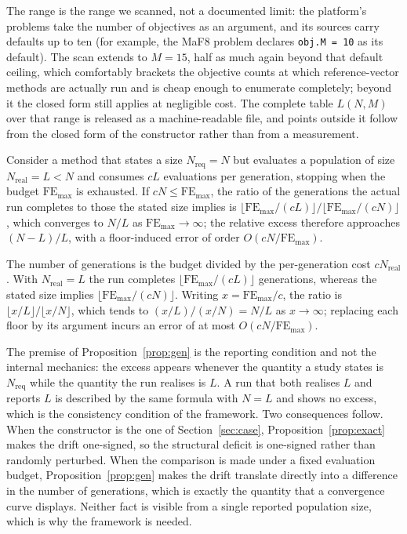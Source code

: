 \documentclass{SCIS2026}
\begin{document}
The range is the range we scanned, not a documented limit: the platform's problems take the number of objectives as an argument, and its sources carry defaults up to ten (for example, the MaF8 problem declares \texttt{obj.M~=~10} as its default). The scan extends to $M=15$, half as much again beyond that default ceiling, which comfortably brackets the objective counts at which reference-vector methods are actually run and is cheap enough to enumerate completely; beyond it the closed form still applies at negligible cost. The complete table $L(N,M)$ over that range is released as a machine-readable file, and points outside it follow from the closed form of the constructor rather than from a measurement.

\begin{proposition}\label{prop:gen}
Consider a method that states a size $N_{\mathrm{req}}=N$ but evaluates a population of size $N_{\mathrm{real}}=L<N$ and consumes $cL$ evaluations per generation, stopping when the budget $\mathrm{FE}_{\max}$ is exhausted. If $cN\le \mathrm{FE}_{\max}$, the ratio of the generations the actual run completes to those the stated size implies is $\big\lfloor \mathrm{FE}_{\max}/(cL)\big\rfloor / \big\lfloor \mathrm{FE}_{\max}/(cN)\big\rfloor$, which converges to $N/L$ as $\mathrm{FE}_{\max}\to\infty$; the relative excess therefore approaches $(N-L)/L$, with a floor-induced error of order $O(cN/\mathrm{FE}_{\max})$.
\end{proposition}

\proof The number of generations is the budget divided by the per-generation cost $cN_{\mathrm{real}}$. With $N_{\mathrm{real}}=L$ the run completes $\lfloor \mathrm{FE}_{\max}/(cL)\rfloor$ generations, whereas the stated size implies $\lfloor \mathrm{FE}_{\max}/(cN)\rfloor$. Writing $x=\mathrm{FE}_{\max}/c$, the ratio is $\lfloor x/L\rfloor / \lfloor x/N\rfloor$, which tends to $(x/L)/(x/N)=N/L$ as $x\to\infty$; replacing each floor by its argument incurs an error of at most $O(cN/\mathrm{FE}_{\max})$.

The premise of Proposition~\ref{prop:gen} is the reporting condition and not the internal mechanics: the excess appears whenever the quantity a study states is $N_{\mathrm{req}}$ while the quantity the run realises is $L$. A run that both realises $L$ and reports $L$ is described by the same formula with $N=L$ and shows no excess, which is the consistency condition of the framework. Two consequences follow. When the constructor is the one of Section~\ref{sec:case}, Proposition~\ref{prop:exact} makes the drift one-signed, so the structural deficit is one-signed rather than randomly perturbed. When the comparison is made under a fixed evaluation budget, Proposition~\ref{prop:gen} makes the drift translate directly into a difference in the number of generations, which is exactly the quantity that a convergence curve displays. Neither fact is visible from a single reported population size, which is why the framework is needed.
\end{document}
